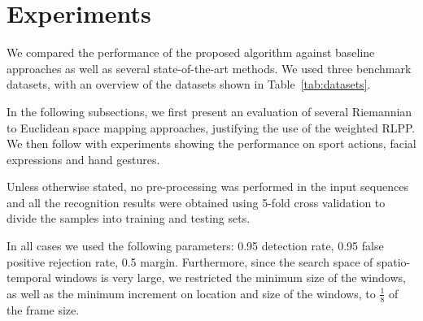 \documentclass[10pt,twocolumn,letterpaper]{article}
\newcommand{\tab}[1]{\mbox{Table~\ref{#1}}}
\begin{document}
\section{Experiments}
\label{sec:experiments}


We compared the performance of the proposed algorithm against 
baseline approaches as well as several state-of-the-art methods.
We used three benchmark datasets, with an overview of the datasets shown in \tab{tab:datasets}.

In the following subsections,
we first present an evaluation of several Riemannian to Euclidean space mapping approaches,
justifying the use of the weighted RLPP.
We then follow with experiments showing the performance on sport actions,
facial expressions and hand gestures.

Unless otherwise stated, no pre-processing was performed in the input sequences
and all the recognition results were obtained using 5-fold cross validation to divide the samples into training and testing sets.


In all cases we used the following parameters:
0.95 detection rate, 0.95 false positive rejection rate, 0.5 margin.
Furthermore, since the search space of spatio-temporal windows is very large,
we restricted the minimum size of the windows,
as well as the minimum increment on location and size of the windows, to {\small $\frac{1}{8}$} of the frame size.
\end{document}
